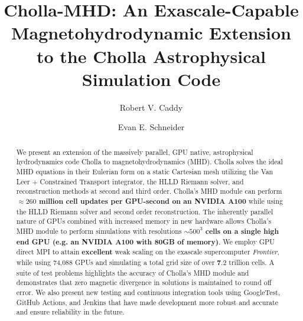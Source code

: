 \documentclass[modern, linenumbers]{aastex631}
\begin{document}
\title{Cholla-MHD: An Exascale-Capable Magnetohydrodynamic Extension to the Cholla Astrophysical Simulation Code}

\author[0000-0002-4475-3181]{Robert V. Caddy}

\author[0000-0001-9735-7484]{Evan E. Schneider}

\begin{abstract}

    We present an extension of the massively parallel, GPU native, astrophysical hydrodynamics code Cholla to magnetohydrodynamics (MHD).
    Cholla solves the ideal MHD equations in their Eulerian form on a static Cartesian mesh utilizing the Van Leer + Constrained Transport integrator, the HLLD Riemann solver, and reconstruction methods at second and third order.
    Cholla's MHD module can perform \textbf{$\approx260$ million cell updates per GPU-second on an NVIDIA A100} while using the HLLD Riemann solver and second order reconstruction.
    The inherently parallel nature of GPUs combined with increased memory in new hardware allows Cholla's MHD module to perform simulations with resolutions \textbf{$\sim500^3$ cells on a single \textbf{high end} GPU (e.g. an NVIDIA A100 with 80GB of memory)}.
    We employ GPU direct MPI to attain \textbf{excellent} weak scaling on the exascale supercomputer \textit{Frontier}, while using 74,088 GPUs and simulating a total grid size of over \textbf{7}.2 trillion cells.
    A suite of test problems highlights the accuracy of Cholla's MHD module and demonstrates that zero magnetic divergence in solutions is maintained to round off error.
    We also present new testing and continuous integration tools using GoogleTest, GitHub Actions, and Jenkins that have made development more robust and accurate and ensure reliability in the future.

    \end{abstract}
\end{document}

